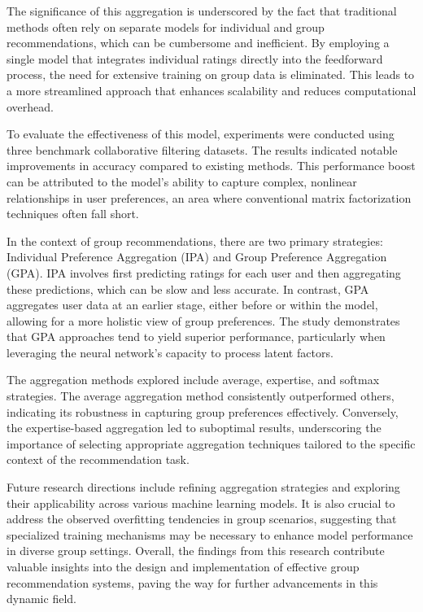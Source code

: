 \documentclass[runningheads]{llncs}
\begin{document}
The significance of this aggregation is underscored by the fact that traditional methods often rely on separate models for individual and group recommendations, which can be cumbersome and inefficient. By employing a single model that integrates individual ratings directly into the feedforward process, the need for extensive training on group data is eliminated. This leads to a more streamlined approach that enhances scalability and reduces computational overhead.

To evaluate the effectiveness of this model, experiments were conducted using three benchmark collaborative filtering datasets. The results indicated notable improvements in accuracy compared to existing methods. This performance boost can be attributed to the model's ability to capture complex, nonlinear relationships in user preferences, an area where conventional matrix factorization techniques often fall short.

In the context of group recommendations, there are two primary strategies: Individual Preference Aggregation (IPA) and Group Preference Aggregation (GPA). IPA involves first predicting ratings for each user and then aggregating these predictions, which can be slow and less accurate. In contrast, GPA aggregates user data at an earlier stage, either before or within the model, allowing for a more holistic view of group preferences. The study demonstrates that GPA approaches tend to yield superior performance, particularly when leveraging the neural network's capacity to process latent factors.

The aggregation methods explored include average, expertise, and softmax strategies. The average aggregation method consistently outperformed others, indicating its robustness in capturing group preferences effectively. Conversely, the expertise-based aggregation led to suboptimal results, underscoring the importance of selecting appropriate aggregation techniques tailored to the specific context of the recommendation task.

Future research directions include refining aggregation strategies and exploring their applicability across various machine learning models. It is also crucial to address the observed overfitting tendencies in group scenarios, suggesting that specialized training mechanisms may be necessary to enhance model performance in diverse group settings. Overall, the findings from this research contribute valuable insights into the design and implementation of effective group recommendation systems, paving the way for further advancements in this dynamic field.
\end{document}
